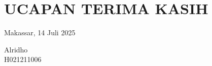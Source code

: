 \begingroup
\chapter*{UCAPAN TERIMA KASIH}
\noindent

\vspace{2cm}

\hfill
\begin{minipage}{0.4\textwidth}
  \raggedleft
  Makassar, 14 Juli 2025 \par
  \vspace{2cm}
  Alridho \\
  H021211006
\end{minipage}
\endgroup
